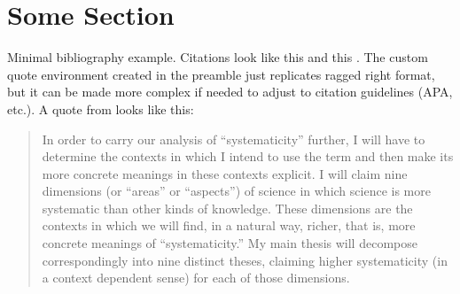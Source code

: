 \documentclass[10pt,a4paper]{article}
\begin{document}
\tableofcontents

\newpage

\section{Some Section}

Minimal bibliography example.
Citations look like this \parencite{hoyningen-huene2013} and this \parencite{manzo.vanderijt2020}.
The custom quote environment created in the preamble just replicates ragged right format, but it can be made more complex if needed to adjust to citation guidelines (APA, etc.).
A quote from \parencite[27]{hoyningen-huene2013} looks like this:
\begin{quote}
	In order to carry our analysis of “systematicity” further, I will have to determine the contexts in which I intend to use the term and then make its more concrete 	meanings in these contexts explicit. I will claim nine dimensions (or “areas” or 	“aspects”) of science in which science is more systematic than other kinds of 	knowledge. These dimensions are the contexts in which we will find, in a natural 	way, richer, that is, more concrete meanings of “systematicity.” My main thesis 	will decompose correspondingly into nine distinct theses, claiming higher 	systematicity (in a context dependent sense) for each of those dimensions.
\end{quote}


\nocite{*}  %
\printbibliography[heading=bibintoc]
\end{document}
